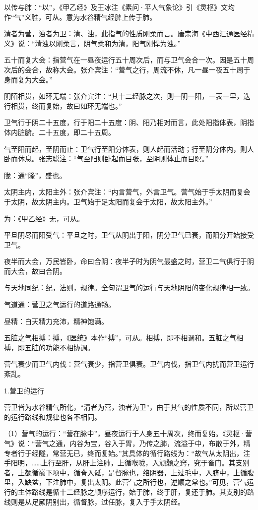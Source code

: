 \documentclass[12pt]{ctexbook}
\begin{document}
\begin{jiaozhu}
	\item 以传与肺：“以”，《甲乙经》及王冰注《素问·平人气象论》引《灵枢》文均作“气”义胜，可从。意为水谷精气经脾上传于肺。
	\item 清者为营，浊者为卫：清、浊，此指气的性质刚柔而言。唐宗海《中西汇通医经精义》说：“清浊以刚柔言，阴气柔和为清，阳气刚悍为浊。”
	\item 五十而复大会：指营气在一昼夜运行五十周次后，而与卫气会合一次。因是五十周次后的会合，故称大会。张介宾注：“营气之行，周流不休，凡一昼一夜五十周于身而复为大会。”
	\item 阴陌相贯，如环无端：张介宾注：“其十二经脉之次，则一阴一阳，一表一里，迭行相贯，终而复始，故曰如环无端也。”
	\item 卫气行于阴二十五度，行于阳二十五度：阴、阳乃相对而言，此处阳指体表，阴指体内脏腑。二十五度，即二十五周。
	\item 气至阳而起，至阴而止：卫气行至阳分体表，则人起而活动；行至阴分体内，则人卧而休息。张志聪注：“气至阳则卧起而目张，至阴则体止而目瞑。”
	\item 陇：通“隆”，盛也。
	\item 太阴主内，太阳主外：张介宾注：“内言营气，外言卫气。营气始于手太阴而复会于太阴，故太阴主内。卫气始于足太阳而复会于太阳，故太阳主外。”
	\item 为：《甲乙经》无，可从。
	\item 平旦阴尽而阳受气：平旦之时，卫气从阴出于阳，阴分卫气已衰，而阳分开始接受卫气。
	\item 夜半而大会，万民皆卧，命曰合阴：夜半子时为阴气最盛之时，营卫二气俱行于阴而大会，故曰合阴。
	\item 与天地同纪：纪，法则，规律。全句谓卫气的运行与天地阴阳的变化规律相一致。
	\item 气道通：营卫之气运行的道路通畅。
	\item 昼精：白天精力充沛，精神饱满。
	\item 五脏之气相搏：搏，《医统》本作“搏”，可从。相搏，即不相调和。五脏之气相搏，即五脏的功能不相协调。
	\item 营气衰少而卫气内伐：营气衰少，指营卫俱衰。卫气内伐，指卫气内扰而营卫运行紊乱。
\end{jiaozhu}


1.营卫的运行

营卫皆为水谷精气所化，“清者为营，浊者为卫”，由于其气的性质不同，所以营卫的运行路线和规律也各不相同。

（1）营气的运行：“营在脉中”，昼夜运行于人身五十周次，终而复始。《灵枢·营气》说：“营气之通，内谷为宝，谷入于胃，乃传之肺，流溢于中，布散于外，精专者行于经隧，常营无已，终而复始。”其具体的循行路线为：“故气从太阴出，注手阳明，……上行至肝，从肝上注肺，上循喉咙，入颃颡之窍，究于畜门。其支别者，上额循巅下项中，循脊入骶，是督脉也，络阴器，上过毛中，入脐中，上循腹里，入缺盆，下注肺中，复出太阴。此营气之所行也，逆顺之常也。”可见，营气运行的主体路线是循十二经脉之顺序运行，始于肺，终于肝，复还于肺。其支别的路线则是从足厥阴别出，循督脉，过任脉，复入于手太阴经。
\end{document}
